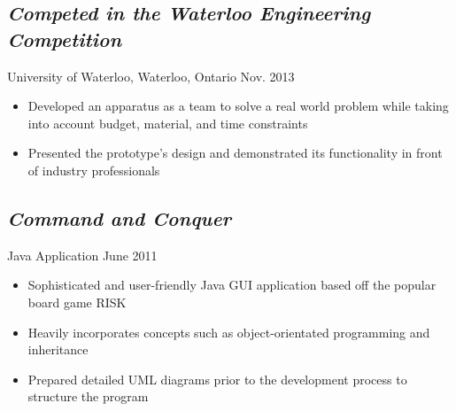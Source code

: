 \documentclass[11pt]{article}
\begin{document}
\begin{minipage}[t]{0.8\linewidth}
	\subsection*{\textit{Competed in the Waterloo Engineering Competition}} \vspace{-6pt} 
		University of Waterloo, Waterloo, Ontario \hspace{115pt} Nov. 2013
		\begin{itemize}
			\item Developed an apparatus as a team to solve a real world problem while taking into account budget, 				material, and time constraints
			\item Presented the prototype's design and demonstrated its functionality in front of industry 								professionals
		\end{itemize}	
	
	\subsection*{\textit{Command and Conquer}} \vspace{-6pt}
		Java Application \hspace{200pt} June 2011
		\begin{itemize}
			\item Sophisticated and user-friendly Java GUI application based off the popular board game RISK
			\item Heavily incorporates concepts such as object-orientated programming and inheritance
			\item Prepared detailed UML diagrams prior to the development process to structure the program
		\end{itemize}
\end{minipage}
\end{document}
